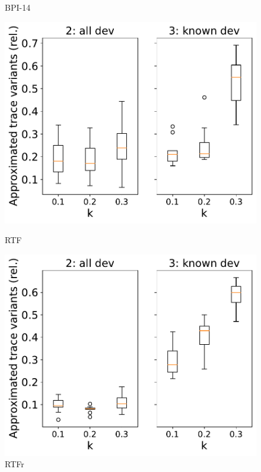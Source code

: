 \documentclass[landscape]{article}
\begin{document}
\begin{figure}[!htb]
\begin{minipage}{0.22\textwidth}
		\caption{BPI-14}
	\end{minipage}
	\hfill
	\begin{minipage}{0.22\textwidth}
		\includegraphics[width=1.0\textwidth]{../Road_Traffic_Fines_Management_Process/Road_Traffic_Fines_Management_Process_approximation_comparison_approximated_variants.pdf}
		\caption{RTF}
	\end{minipage}
	\hfill
	\begin{minipage}{0.22\textwidth}
	\includegraphics[width=1.0\textwidth]{../RTFM_model2/RTFM_model2_approximation_comparison_approximated_variants.pdf}
		\caption{RTFr}
	\end{minipage}
\end{figure}

	
\end{document}
